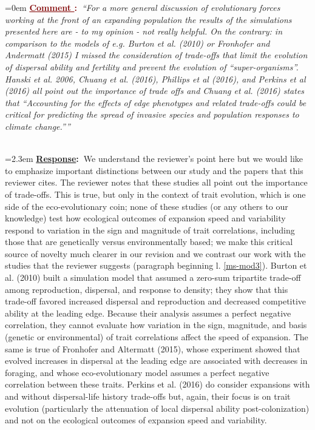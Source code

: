 \documentclass[12pt]{article}
\newcounter{cN}
\newcommand{\comment}[1]{
	\vspace{2em}
	\refstepcounter{cN} %
	\noindent \hangindent=0em \textbf{\textcolor{Maroon}{\uline{Comment \thecN}:~}}\emph{``#1''}
	}
\newcommand{\response}[1]{
	\\[0.25em]
	\hangindent=2.3em \textbf{\textcolor{NavyBlue}{\uline{Response}:~}}#1
	}
\begin{document}
\comment{For a more general discussion of evolutionary forces working at the front of an expanding population the results of the simulations presented here are - to my opinion - not really helpful.
On the contrary: in comparison to the models of e.g. Burton et al. (2010) or Fronhofer and Andermatt (2015) I missed the consideration of trade-offs that limit the evolution of dispersal ability and fertility and prevent the evolution of ``super-organisms''. Hanski et al. 2006, Chuang et al. (2016), Phillips et al (2016), and Perkins et al (2016) all point out the importance of trade offs and Chuang et al. (2016) states that ``Accounting for the effects of edge phenotypes and related trade-offs could be critical for predicting the spread of invasive species and population responses to climate change.''}
\response{We understand the reviewer's point here but we would like to emphasize important distinctions between our study and the papers that this reviewer cites.
The reviewer notes that these studies all point out the importance of trade-offs.
This is true, but only in the context of trait evolution, which is one side of the eco-evolutionary coin; none of these studies (or any others to our knowledge) test how ecological outcomes of expansion speed and variability respond to variation in the sign and magnitude of trait correlations, including those that are genetically versus environmentally based; we make this critical source of novelty much clearer in our revision and we contrast our work with the studies that the reviewer suggests (paragraph beginning l. \ref{ms-mod3}).
Burton et al. (2010) built a simulation model that assumed a zero-sum tripartite trade-off among reproduction, dispersal, and response to density; they show that this trade-off favored increased dispersal and reproduction and decreased competitive ability at the leading edge.
Because their analysis assumes a perfect negative correlation, they cannot evaluate how variation in the sign, magnitude, and basis (genetic or environmental) of trait correlations affect the speed of expansion.
The same is true of Fronhofer and Altermatt (2015), whose experiment showed that evolved increases in dispersal at the leading edge are associated with decreases in foraging, and whose eco-evolutionary model assumes a perfect negative correlation between these traits.
Perkins et al. (2016) do consider expansions with and without dispersal-life history trade-offs but, again, their focus is on trait evolution (particularly the attenuation of local dispersal ability post-colonization) and not on the ecological outcomes of expansion speed and variability.
}
\end{document}
